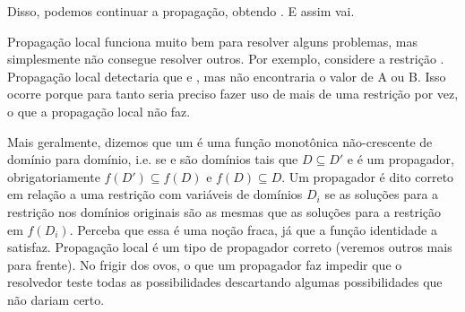 \documentclass{article}
\begin{document}
\begin{center}
\end{center}

Disso, podemos continuar a propagação, obtendo . E assim vai.

Propagação local funciona muito bem para resolver alguns problemas, mas simplesmente não consegue resolver outros. Por exemplo, considere a restrição . Propagação local detectaria que  e , mas não encontraria o valor de A ou B. Isso ocorre porque para tanto seria preciso fazer uso de mais de uma restrição por vez, o que a propagação local não faz.

Mais geralmente, dizemos que um  é uma função monotônica não-crescente de domínio para
domínio, i.e. se  e  são domínios tais que $D \subseteq D'$ e 
é um propagador, obrigatoriamente $f(D') \subseteq f(D)$ e $f(D) \subseteq D$. Um propagador é dito
correto em relação a uma restrição  com variáveis de domínios $D_i$ se as soluções para
a restrição nos domínios originais são as mesmas que as soluções para a restrição em $f(D_i)$.
Perceba que essa é uma noção fraca, já que a função identidade a satisfaz. Propagação local é um
tipo de propagador correto (veremos outros mais para frente). No frigir dos ovos, o que um
propagador faz impedir que o resolvedor teste todas as possibilidades descartando algumas possibilidades que não dariam certo.
\end{document}
